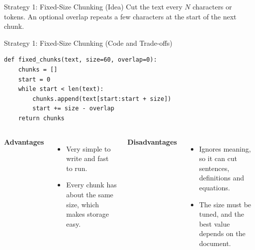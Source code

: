 \documentclass[aspectratio=169,10pt]{beamer}
\begin{document}
\begin{frame}[t]{Strategy 1: Fixed-Size Chunking (Idea)}
\small
Cut the text every $N$ characters or tokens. An optional overlap repeats a few characters at the start of the next chunk.
\vspace{14pt}
\begin{center}
\end{center}
\end{frame}

\begin{frame}[t,fragile]{Strategy 1: Fixed-Size Chunking (Code and Trade-offs)}
\small
\begin{lstlisting}
def fixed_chunks(text, size=60, overlap=0):
    chunks = []
    start = 0
    while start < len(text):
        chunks.append(text[start:start + size])
        start += size - overlap
    return chunks
\end{lstlisting}
\vspace{6pt}
\begin{columns}[T]
\textbf{Advantages}
\begin{itemize}
  \item Very simple to write and fast to run.
  \item Every chunk has about the same size, which makes storage easy.
\end{itemize}
\textbf{Disadvantages}
\begin{itemize}
  \item Ignores meaning, so it can cut sentences, definitions and equations.
  \item The size must be tuned, and the best value depends on the document.
\end{itemize}
\end{columns}
\end{frame}
\end{document}
